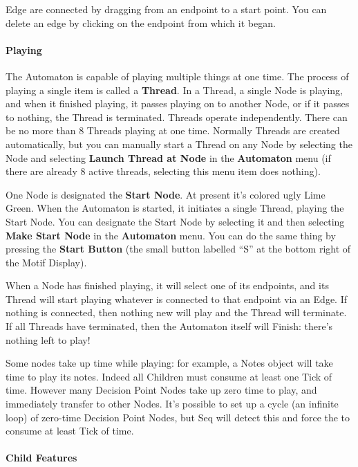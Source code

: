 \documentclass[twoside,10pt]{article}
\begin{document}
Edge are connected by dragging from an endpoint to a start point.  You can delete an edge by clicking on the endpoint from which it began.

\paragraph{Playing}

The Automaton is capable of playing multiple things at one time.  The process of playing a single item is called a {\bf Thread}.   In a Thread, a single Node is playing, and when it finished playing, it passes playing on to another Node, or if it passes to nothing, the Thread is terminated.  Threads operate independently.  There can be no more than 8 Threads playing at one time.  Normally Threads are created automatically, but you can manually start a Thread on any Node by selecting the Node and selecting {\bf Launch Thread at Node} in the {\bf Automaton} menu (if there are already 8 active threads, selecting this menu item does nothing).

One Node is designated the {\bf Start Node}.  At present it's colored ugly Lime Green.  When the Automaton is started, it initiates a single Thread, playing the Start Node.  You can designate the Start Node by selecting it and then selecting {\bf Make Start Node} in the {\bf Automaton} menu.  You can do the same thing by pressing the {\bf Start Button} (the small button labelled ``S'' at the bottom right of the Motif Display).

When a Node has finished playing, it will select one of its endpoints, and its Thread will start playing whatever is connected to that endpoint via an Edge.  If nothing is connected, then nothing new will play and the Thread will terminate.  If all Threads have terminated, then the Automaton itself will Finish: there's nothing left to play!

Some nodes take up time while playing: for example, a Notes object will take time to play its notes.  Indeed all Children must consume at least one Tick of time.  However many Decision Point Nodes take up zero time to play, and immediately transfer to other Nodes.  It's possible to set up a cycle (an infinite loop) of zero-time Decision Point Nodes, but Seq will detect this and force the to consume at least Tick of time.

\paragraph{Child Features}
\end{document}
